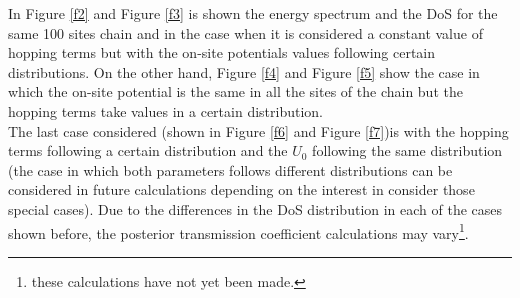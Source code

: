 \documentclass[12pt]{article}
\begin{document}
In Figure \ref{f2} and Figure \ref{f3} is shown the energy spectrum and the DoS for the same 100 sites chain and in the case when it is considered a constant value of hopping terms but with the on-site potentials values following certain distributions. On the other hand, Figure \ref{f4} and Figure \ref{f5} show the case in which the on-site potential is the same in all the sites of the chain but the hopping terms take values in a certain distribution.\\


The last case considered (shown in Figure \ref{f6} and Figure \ref{f7})is with the hopping terms following a certain distribution and the $U_{0}$ following the same distribution (the case in which both parameters follows different distributions can be considered in future calculations depending on the interest in consider those special cases). Due to the differences in the DoS distribution in each of the cases shown before, the posterior transmission coefficient calculations may vary\footnote{these calculations have not yet been made.}. 
\end{document}
